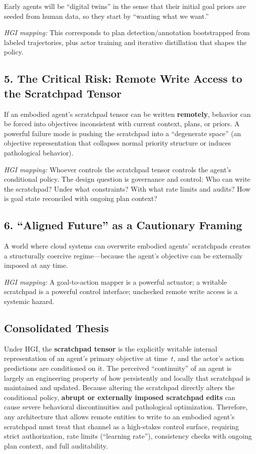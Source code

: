 \documentclass[12pt, a4paper]{article}
\begin{document}
Early agents will be ``digital twins'' in the sense that their initial goal priors are seeded from human data, so they start by ``wanting what we want.''

\textit{HGI mapping:} This corresponds to plan detection/annotation bootstrapped from labeled trajectories, plus actor training and iterative distillation that shapes the policy.

\subsection*{5. The Critical Risk: Remote Write Access to the Scratchpad Tensor}

If an embodied agent's scratchpad tensor can be written \textbf{remotely}, behavior can be forced into objectives inconsistent with current context, plans, or priors. A powerful failure mode is pushing the scratchpad into a ``degenerate space'' (an objective representation that collapses normal priority structure or induces pathological behavior).

\textit{HGI mapping:} Whoever controls the scratchpad tensor controls the agent's conditional policy. The design question is governance and control: Who can write the scratchpad? Under what constraints? With what rate limits and audits? How is goal state reconciled with ongoing plan context?

\subsection*{6. ``Aligned Future'' as a Cautionary Framing}

A world where cloud systems can overwrite embodied agents' scratchpads creates a structurally coercive regime---because the agent's objective can be externally imposed at any time.

\textit{HGI mapping:} A goal-to-action mapper is a powerful actuator; a writable scratchpad is a powerful control interface; unchecked remote write access is a systemic hazard.

\subsection*{Consolidated Thesis}

Under HGI, the \textbf{scratchpad tensor} is the explicitly writable internal representation of an agent's primary objective at time~$t$, and the actor's action predictions are conditioned on it. The perceived ``continuity'' of an agent is largely an engineering property of how persistently and locally that scratchpad is maintained and updated. Because altering the scratchpad directly alters the conditional policy, \textbf{abrupt or externally imposed scratchpad edits} can cause severe behavioral discontinuities and pathological optimization. Therefore, any architecture that allows remote entities to write to an embodied agent's scratchpad must treat that channel as a high-stakes control surface, requiring strict authorization, rate limits (``learning rate''), consistency checks with ongoing plan context, and full auditability.
\end{document}
